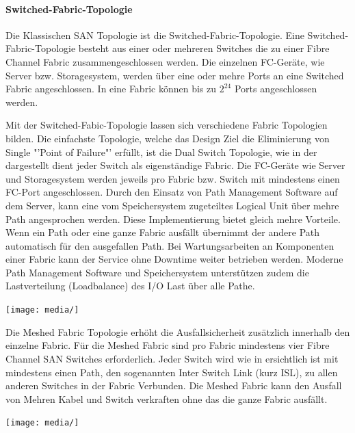 \paragraph*{Switched-Fabric-Topologie}
Die Klassischen SAN Topologie ist die Switched-Fabric-Topologie. Eine Switched-Fabric-Topologie besteht aus einer oder mehreren Switches die zu einer Fibre Channel Fabric zusammengeschlossen werden. Die einzelnen FC-Geräte, wie Server bzw. Storagesystem, werden über eine oder mehre Ports an eine Switched Fabric angeschlossen. In eine Fabric können bis zu $2^{24}$ Ports angeschlossen werden.\cite{Gupta2002}\cite{Christopher2009}

Mit der Switched-Fabic-Topologie lassen sich verschiedene Fabric Topologien bilden.
Die einfachste Topologie, welche das Design Ziel die Eliminierung von Single "'Point of Failure"' erfüllt, ist die Dual Switch Topologie, wie in der  dargestellt dient jeder Switch als eigenständige Fabric. Die FC-Geräte wie Server und Storagesystem werden jeweils pro Fabric bzw. Switch mit mindestens einen FC-Port angeschlossen. Durch den Einsatz von Path Management Software auf dem Server, kann eine vom Speichersystem zugeteiltes Logical Unit über mehre Path angesprochen werden. Diese Implementierung bietet gleich mehre Vorteile. Wenn ein Path oder eine ganze Fabric ausfällt übernimmt der andere Path automatisch für den ausgefallen Path. Bei Wartungsarbeiten an Komponenten einer Fabric kann der Service ohne Downtime weiter betrieben werden. Moderne Path Management Software und Speichersystem unterstützen zudem die Lastverteilung (Loadbalance) des I/O Last über alle Pathe.\cite{Christopher2009}

\begin{center}
\texttt{[image: media/]}
\end{center}

Die Meshed Fabric Topologie erhöht die Ausfallsicherheit zusätzlich innerhalb den einzelne Fabric. Für die Meshed Fabric sind pro Fabric mindestens vier Fibre Channel SAN Switches erforderlich. Jeder Switch wird wie in  ersichtlich ist mit mindestens einen Path, den sogenannten Inter Switch Link (kurz ISL), zu allen anderen Switches in der Fabric Verbunden. Die Meshed Fabric kann den Ausfall von Mehren Kabel und Switch verkraften ohne das die ganze Fabric ausfällt.\cite{Christopher2009}

\begin{center}
\texttt{[image: media/]}
\end{center}

